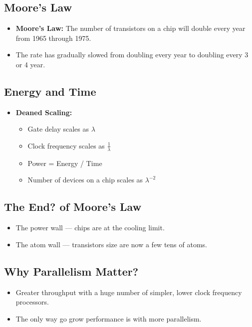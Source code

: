\documentclass[../main.tex]{subfiles}
\begin{document}
\subsection{Moore's Law}

\begin{itemize}
	\item \textbf{Moore's Law:} The number of transistors on a chip will double every year from 1965 through 1975.
	\item The rate has gradually slowed from doubling every year to doubling every 3 or 4 year.
\end{itemize}

\subsection{Energy and Time}

\begin{itemize}
	\item \textbf{Deaned Scaling:}
	      \begin{itemize}
		      \item Gate delay scales as \(\lambda\)
		      \item Clock frequency scales as \(\frac{1}{\lambda}\)
		      \item Power = Energy / Time
		      \item Number of devices on a chip scales as \(\lambda^{-2}\)
	      \end{itemize}
\end{itemize}

\subsection{The End? of Moore's Law}

\begin{itemize}
	\item The power wall --- chips are at the cooling limit.
	\item The atom wall --- transistors size are now a few tens of atoms.
\end{itemize}

\subsection{Why Parallelism Matter?}

\begin{itemize}
	\item Greater throughput with a huge number of simpler, lower clock frequency processors.
	\item The only way go grow performance is with more parallelism.
\end{itemize}
\end{document}
